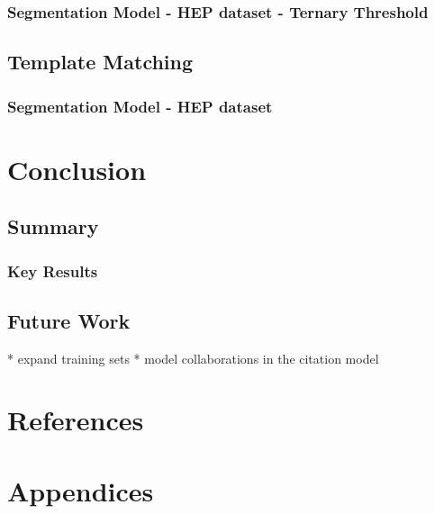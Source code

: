 \documentclass[10pt, oneside]{scrartcl}   	%
\begin{document}
\subsubsection{Segmentation Model - HEP dataset - Ternary Threshold}
\subsection{Template Matching}
\subsubsection{Segmentation Model - HEP dataset}
\section{Conclusion}
\subsection{Summary}
\subsubsection{Key Results}
\subsection{Future Work}
* expand training sets
* model collaborations in the citation model
\section{References}
\section{Appendices}



\end{document}
